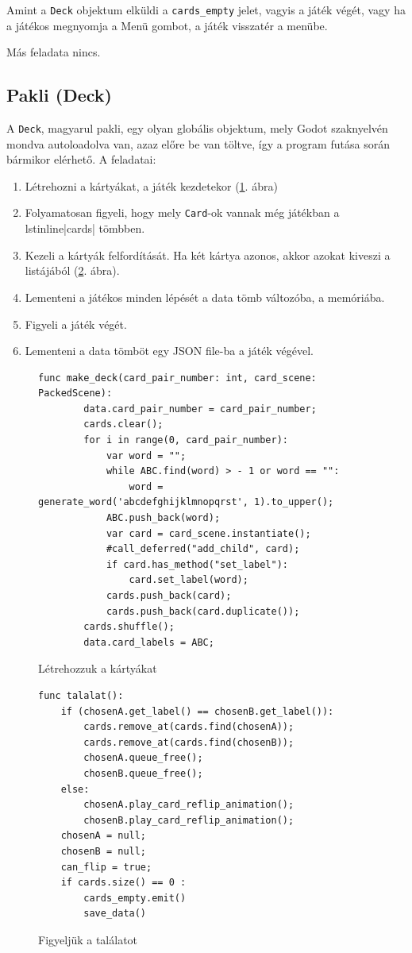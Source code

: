 Amint a \lstinline|Deck| objektum elküldi a \lstinline{cards_empty} jelet, vagyis a játék végét, vagy ha a játékos megnyomja a Menü gombot, a játék visszatér a menübe. 

Más feladata nincs. 


\subsection{Pakli (Deck)}
A \lstinline|Deck|, magyarul pakli, egy olyan globális objektum, mely Godot szaknyelvén mondva autoloadolva van, azaz előre be van töltve, így a program futása során bármikor elérhető. A feladatai: 
\begin{enumerate}
\item Létrehozni a kártyákat, a játék kezdetekor (\ref{code:make_deck}. ábra)
\item Folyamatosan figyeli, hogy mely \lstinline|Card|-ok vannak még játékban a lstinline|cards| tömbben.
\item Kezeli a kártyák felfordítását. Ha két kártya azonos, akkor azokat kiveszi a listájából (\ref{code:talalat}. ábra).
\item Lementeni a játékos minden lépését a data tömb változóba, a memóriába. 
\item Figyeli a játék végét.
\item Lementeni a data tömböt egy JSON file-ba a játék végével.
\end{enumerate}

\begin{figure}[h]
    \centering
    \begin{lstlisting}[language=GDScript]
    func make_deck(card_pair_number: int, card_scene: PackedScene):
        data.card_pair_number = card_pair_number;
        cards.clear();
        for i in range(0, card_pair_number):
            var word = "";
            while ABC.find(word) > - 1 or word == "":
                word = generate_word('abcdefghijklmnopqrst', 1).to_upper();
            ABC.push_back(word);
            var card = card_scene.instantiate();
            #call_deferred("add_child", card);
            if card.has_method("set_label"):
                card.set_label(word);
            cards.push_back(card);
            cards.push_back(card.duplicate());
        cards.shuffle();
        data.card_labels = ABC;
    \end{lstlisting}
    \caption{Létrehozzuk a kártyákat}
    \label{code:make_deck}
\end{figure}
\begin{figure}[h]
    \centering
    \begin{lstlisting}[language=GDScript]
func talalat():
	if (chosenA.get_label() == chosenB.get_label()):
		cards.remove_at(cards.find(chosenA));
		cards.remove_at(cards.find(chosenB));
		chosenA.queue_free();
		chosenB.queue_free();
	else:
		chosenA.play_card_reflip_animation();
		chosenB.play_card_reflip_animation();
	chosenA = null;
	chosenB = null;
	can_flip = true;
	if cards.size() == 0 :
		cards_empty.emit()
		save_data()
    \end{lstlisting}
    \caption{Figyeljük a találatot}
    \label{code:talalat}
\end{figure}



